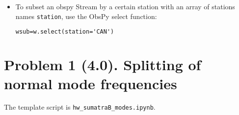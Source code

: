 \documentclass[11pt,titlepage,fleqn]{article}
\newcommand{\tfilemodes}{{\tt hw\_sumatraB\_modes.ipynb}}
\begin{document}
\begin{spacing}{1.0}
\begin{itemize}
\begin{itemize}
\item instrument response and Fourier analysis: \citet[][Ch.~6]{SteinWysession}
\item directivity: \citet[][Section 4.3.2]{SteinWysession} 
\item Sumatra earthquake: \citet{Lay2005,Ammon2005,Park2005,Ni2005,SSteinOkal2007}
\item normal modes: \citet[][Section 2.9]{SteinWysession} and \citet[][Ch.~8]{DT}. See also ``Computational details'' in Section 10.5.1 of DT.
\item PDFs of all referenced Sumatra papers can be found in the class google drive.


\end{itemize}


\item To subset an obspy Stream by a certain station with an array of stations names \verb+station+, use the ObsPy select function:
%
\begin{verbatim}
wsub=w.select(station='CAN')
\end{verbatim}

%
%

\end{itemize}

\end{spacing}


\pagebreak
\section*{Problem 1 (4.0). Splitting of normal mode frequencies}

The template script is \tfilemodes.
\end{document}
